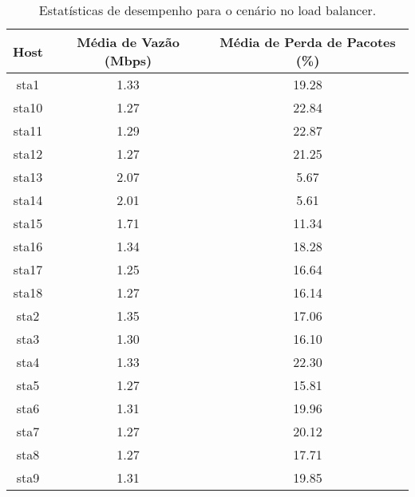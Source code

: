 \begin{table}[htbp]
    \centering
    \label{tab:no_load_balancer_stats}
    \begin{tabular}{|c|c|c|}
        \hline
        \textbf{Host} & \textbf{Média de Vazão (Mbps)} & \textbf{Média de Perda de Pacotes (\%)} \\ \hline
        sta1 & 1.33 & 19.28 \\ \hline
        sta10 & 1.27 & 22.84 \\ \hline
        sta11 & 1.29 & 22.87 \\ \hline
        sta12 & 1.27 & 21.25 \\ \hline
        sta13 & 2.07 & 5.67 \\ \hline
        sta14 & 2.01 & 5.61 \\ \hline
        sta15 & 1.71 & 11.34 \\ \hline
        sta16 & 1.34 & 18.28 \\ \hline
        sta17 & 1.25 & 16.64 \\ \hline
        sta18 & 1.27 & 16.14 \\ \hline
        sta2 & 1.35 & 17.06 \\ \hline
        sta3 & 1.30 & 16.10 \\ \hline
        sta4 & 1.33 & 22.30 \\ \hline
        sta5 & 1.27 & 15.81 \\ \hline
        sta6 & 1.31 & 19.96 \\ \hline
        sta7 & 1.27 & 20.12 \\ \hline
        sta8 & 1.27 & 17.71 \\ \hline
        sta9 & 1.31 & 19.85 \\ \hline
    \end{tabular}
    \caption{Estatísticas de desempenho para o cenário no load balancer.}
\end{table}

